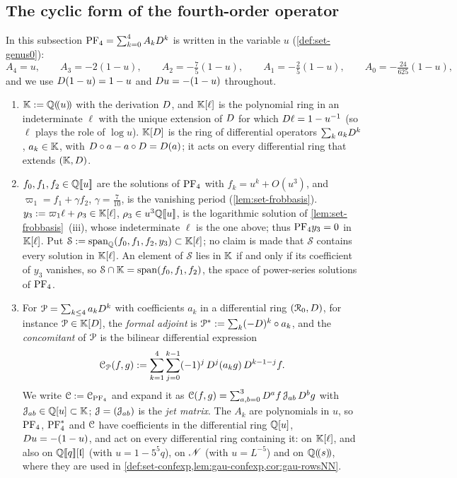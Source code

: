 \subsection{The cyclic form of the fourth-order operator}
\label{sec:gau-cyc}

In this subsection $\mathrm{PF}_{4}=\sum_{k=0}^4A_kD^k$ is written in the variable $u$ (\cref{def:set-genus0}):
\[
A_4=u,\qquad A_3=-2(1-u),\qquad A_2=-\tfrac75(1-u),\qquad A_1=-\tfrac25(1-u),\qquad A_0=-\tfrac{24}{625}(1-u),
\]
and we use $D(1-u)=1-u$ and $D u=-(1-u)$ throughout.

\begin{defn}
\label{def:gau-conc}
\begin{enumerate}
\item $\mathbb{K}:=\mathbb{Q}(\!(u)\!)$ with the derivation $D$, and $\mathbb{K}[\ell]$ is the polynomial ring in an indeterminate $\ell$ with the unique extension of $D$ for which $D\ell=1-u^{-1}$ (so $\ell$ plays the role of $\log u$). $\mathbb{K}[D]$ is the ring of differential operators $\sum_ka_kD^k$, $a_k\in\mathbb{K}$, with $D\circ a-a\circ D=D(a)$; it acts on every differential ring that extends $(\mathbb{K},D)$.
\item $f_0,f_1,f_2\in\mathbb{Q}[\![ u ]\!]$ are the solutions of $\mathrm{PF}_{4}$ with $f_k=u^k+O(u^3)$, and $\varpi_1=f_1+\gamma f_2$, $\gamma=\frac7{10}$, is the vanishing period (\cref{lem:set-frobbasis}). $y_3:=\varpi_1\ell+\rho_3\in\mathbb{K}[\ell]$, $\rho_3\in u^3\mathbb{Q}[\![ u ]\!]$, is the logarithmic solution of \cref{lem:set-frobbasis}~(iii), whose indeterminate $\ell$ is the one above; thus $\mathrm{PF}_{4} y_3=0$ in $\mathbb{K}[\ell]$. Put $\mathcal S:=\operatorname{span}_{\mathbb{Q}}(f_0,f_1,f_2,y_3)\subset\mathbb{K}[\ell]$; no claim is made that $\mathcal S$ contains every solution in $\mathbb{K}[\ell]$. An element of $\mathcal S$ lies in $\mathbb{K}$ if and only if its coefficient of $y_3$ vanishes, so $\mathcal S\cap\mathbb{K}=\operatorname{span}(f_0,f_1,f_2)$, the space of power-series solutions of $\mathrm{PF}_{4}$.
\item For $\mathcal{P}=\sum_{k\leq4}a_kD^k$ with coefficients $a_k$ in a differential ring $(\mathcal{R}_0,D)$, for instance $\mathcal{P}\in\mathbb{K}[D]$, the \emph{formal adjoint} is $\mathcal{P}^*:=\sum_k(-D)^k\circ a_k$, and the \emph{concomitant} of $\mathcal{P}$ is the bilinear differential expression
\[
\mathcal{C}_{\mathcal{P}}(f,g):=\sum_{k=1}^4\sum_{j=0}^{k-1}(-1)^j\,D^j(a_kg)\,D^{k-1-j}f .
\]
We write $\mathcal{C}:=\mathcal{C}_{\mathrm{PF}_{4}}$ and expand it as $\mathcal{C}(f,g)=\sum_{a,b=0}^3D^af\,\mathcal{J}_{ab}\,D^bg$ with $\mathcal{J}_{ab}\in\mathbb{Q}[u]\subset\mathbb{K}$; $\mathcal{J}=(\mathcal{J}_{ab})$ is the \emph{jet matrix}. The $A_k$ are polynomials in $u$, so $\mathrm{PF}_{4}$, $\mathrm{PF}_{4}^*$ and $\mathcal{C}$ have coefficients in the differential ring $\mathbb{Q}[u]$, $D u=-(1-u)$, and act on every differential ring containing it: on $\mathbb{K}[\ell]$, and also on $\mathbb{Q}[\![ q ]\!][\mathfrak{l}]$ (with $u=1-5^5q$), on $\mathscr{N}$ (with $u=L^{-5}$) and on $\mathbb{Q}(\!(s)\!)$, where they are used in \cref{def:set-confexp,lem:gau-confexp,cor:gau-rowsNN}.

\end{enumerate}
\end{defn}
